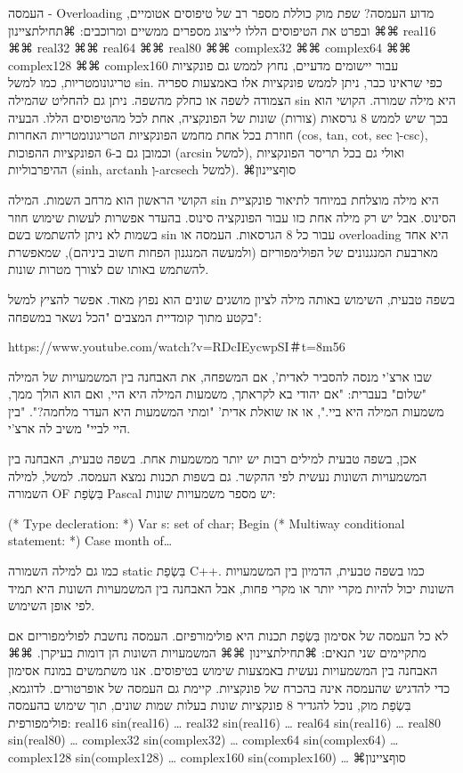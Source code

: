       העמסה - Overloading
      מדוע העמסה?
      שפת מוק כוללת מספר רב של טיפוסים אטומיים, ובפרט את הטיפוסים הללו לייצוג מספרים ממשיים ומרוכבים:
      ⌘תחילת{ציינון}
      ⌘⌘ real16
      ⌘⌘ real32
      ⌘⌘ real64
      ⌘⌘ real80
⌘⌘     complex32
⌘⌘     complex64
⌘⌘     complex128
⌘⌘     complex160
      עבור יישומים מדעיים, נחוץ לממש גם פונקציות טריגונומטריות, כמו למשל sin. כפי שראינו כבר, ניתן לממש פונקציות אלו באמצעות ספריה הצמודה לשפה או כחלק מהשפה. ניתן גם להחליט שהמילה sin היא מילה שמורה. הקושי הוא בכך שיש לממש 8 גרסאות (צורות) שונות של הפונקציה, אחת לכל מהטיפוסים הללו. הבעיה חוזרת בכל אחת מחמש הפונקציות הטריגונומטריות האחרות (cos, tan, cot, sec וְ-csc), וכמובן גם ב-6 הפונקציות ההפוכות (arcsin למשל), ואולי גם בכל תריסר הפונקציות ההיפרבוליות (sinh, arctanh וְ-arcsech למשל).
  ⌘סוף{ציינון}

      הקושי הראשון הוא מרחב השמות. המילה sin היא מילה מוצלחת במיוחד לתיאור פונקציית הסינוס. אבל יש רק מילה אחת כזו עבור הפונקציה סינוס. בהעדר אפשרות לעשות שימוש חוזר בשמות לא ניתן להשתמש בשם sin עבור כל 8 הגרסאות. העמסה או overloading היא אחד מארבעת המנגנונים של הפולימפוריזם (ולמעשה המנגנון הפחות חשוב ביניהם), שמאפשרת להשתמש באותו שם לצורך מטרות שונות.

      בשפה טבעית, השימוש באותה מילה לציון מושגים שונים הוא נפוץ מאוד. אפשר להציץ למשל בקטע מתוך קומדיית המצבים "הכל נשאר במשפחה":

      https://www.youtube.com/watch?v=RDcIEycwpSI＃t=8m56

      שבו ארצ'י מנסה להסביר לאדית', אם המשפחה, את האבחנה בין המשמעויות של המילה "שלום" בעברית: "אם יהודי בא לקראתך, משמעות המילה היא היי, ואם הוא הולך ממך, משמעות המילה היא ביי.", או אז שואלת אדית' "ומתי המשמעות היא העדר מלחמה?". "בין היי לביי" משיב לה ארצ'י.

      אכן, בשפה טבעית למילים רבות יש יותר ממשמעות אחת. בשפה טבעית, האבחנה בין המשמעויות השונות נעשית לפי ההקשר. גם בשפות תכנות נמצא העמסה. למשל, למילה השמורה OF בִּשְׂפַת Pascal יש מספר משמעויות שונות:

      (* Type decleration: *)
      Var s: set of char;
      Begin
      (* Multiway conditional statement: *)
      Case month of…

      כמו גם למילה השמורה static בִּשְׂפַת C++. כמו בשפה טבעית, הדמיון בין המשמעויות השונות יכול להיות מקרי יותר או מקרי פחות, אבל האבחנה בין המשמעויות השונות היא תמיד לפי אופן השימוש.

      לא כל העמסה של אסימון בִּשְׂפַת תכנות היא פולימורפיזם. העמסה נחשבת לפולימפוריזם אם מתקיימים שני תנאים:
      ⌘תחילת{ציינון}
      ⌘⌘ המשמעויות השונות הן דומות בעיקרן.
      ⌘⌘ האבחנה בין המשמעויות נעשית באמצעות שימוש בטיפוסים.
      אנו משתמשים במונח אסימון כדי להדגיש שהעמסה אינה בהכרח של פונקציות. קיימת גם העמסה של אופרטורים.
      לדוגמא, בִּשְׂפַת מוק, נוכל להגדיר 8 פונקציות שונות בעלות שמות שונים, תוך שימוש בהעמסה פולימפורפית:
      real16 sin(real16) { … }
      real32 sin(real16) { … }
      real64 sin(real16) { … }
      real80 sin(real80) { … }
      complex32 sin(complex32) { … }
      complex64 sin(complex64) { … }
      complex128 sin(complex128) { … }
      complex160 sin(complex160) { … }
  ⌘סוף{ציינון}

